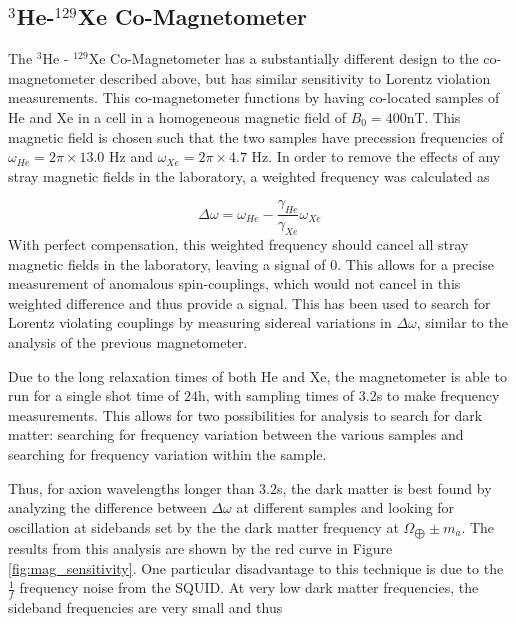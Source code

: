 \documentclass[aps,prd,final,letterpaper]{revtex4}
\begin{document}
\subsection{$^{3}$He-$^{129}$Xe Co-Magnetometer}

The $^{3}$He - $^{129}$Xe Co-Magnetometer has a substantially different design to the co-magnetometer described above, but has similar sensitivity to Lorentz violation measurements. This co-magnetometer functions by having co-located samples of He and Xe in a cell in a homogeneous magnetic field of $B_0 = 400$nT. This magnetic field is chosen such that the two samples have precession frequencies of $\omega_{He} = 2\pi \times 13.0$ Hz and $\omega_{Xe} = 2\pi \times 4.7$ Hz. In order to remove the effects of any stray magnetic fields in the laboratory, a weighted frequency was calculated as

\begin{equation}
\Delta \omega = \omega_{He} - \frac{\gamma_{He}}{\gamma_{Xe}}\omega_{Xe}
\end{equation}
With perfect compensation, this weighted frequency should cancel all stray magnetic fields in the laboratory, leaving a signal of $0$. This allows for a precise measurement of anomalous spin-couplings, which would not cancel in this weighted difference and thus provide a signal. This has been used to search for Lorentz violating couplings by measuring sidereal variations in $\Delta \omega$, similar to the analysis of the previous magnetometer.  

Due to the long relaxation times of both He and Xe, the magnetometer is able to run for a single shot time of $24$h, with sampling times of $3.2$s to make frequency measurements. This allows for two possibilities for analysis to search for dark matter: searching for frequency variation between the various samples and searching for frequency variation within the sample.



 Thus, for axion wavelengths longer than $3.2$s, the dark matter is best found by analyzing the difference between $\Delta \omega$ at different samples and looking for oscillation at sidebands set by the the dark matter frequency at $\Omega_{\bigoplus} \pm m_a$. The results from this analysis are shown by the red curve in Figure \ref{fig:mag_sensitivity}. One particular disadvantage to this technique is due to the $\frac{1}{f}$ frequency noise from the SQUID. At very low dark matter frequencies, the sideband frequencies are very small and thus 
\end{document}
